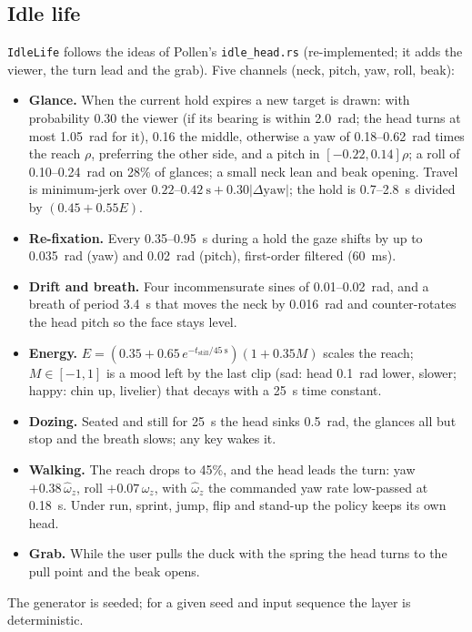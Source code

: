 \documentclass[11pt]{article}
\newcommand{\code}[1]{\texttt{\small #1}}
\begin{document}
\subsection{Idle life}\label{sec:idle}
\code{IdleLife} follows the ideas of Pollen's \code{idle\_head.rs} \cite{microduck} (re-implemented; it adds the
viewer, the turn lead and the grab). Five channels (neck, pitch, yaw, roll, beak):
\begin{itemize}[nosep]
\item \textbf{Glance.} When the current hold expires a new target is drawn: with probability 0.30 the viewer (if
  its bearing is within 2.0~rad; the head turns at most 1.05~rad for it), 0.16 the middle, otherwise a yaw of
  0.18--0.62~rad times the reach $\rho$, preferring the other side, and a pitch in $[-0.22, 0.14]\rho$; a roll of
  0.10--0.24~rad on 28\% of glances; a small neck lean and beak opening. Travel is minimum-jerk over
  $0.22$--$0.42~\text{s}+0.30|\Delta\text{yaw}|$; the hold is 0.7--2.8~s divided by $(0.45+0.55E)$.
\item \textbf{Re-fixation.} Every 0.35--0.95~s during a hold the gaze shifts by up to 0.035~rad (yaw) and 0.02~rad
  (pitch), first-order filtered (60~ms).
\item \textbf{Drift and breath.} Four incommensurate sines of 0.01--0.02~rad, and a breath of period 3.4~s that moves
  the neck by 0.016~rad and counter-rotates the head pitch so the face stays level.
\item \textbf{Energy.} $E = (0.35+0.65\,e^{-t_\text{still}/45~\text{s}})(1+0.35M)$ scales the reach; $M\in[-1,1]$ is
  a mood left by the last clip (sad: head 0.1~rad lower, slower; happy: chin up, livelier) that decays with a 25~s
  time constant.
\item \textbf{Dozing.} Seated and still for 25~s the head sinks 0.5~rad, the glances all but stop and the breath
  slows; any key wakes it.
\item \textbf{Walking.} The reach drops to 45\%, and the head leads the turn: yaw $+0.38\,\hat\omega_z$, roll
  $+0.07\,\hat\omega_z$, with $\hat\omega_z$ the commanded yaw rate low-passed at 0.18~s. Under run, sprint, jump,
  flip and stand-up the policy keeps its own head.
\item \textbf{Grab.} While the user pulls the duck with the spring the head turns to the pull point and the beak
  opens.
\end{itemize}
The generator is seeded; for a given seed and input sequence the layer is deterministic.
\end{document}
